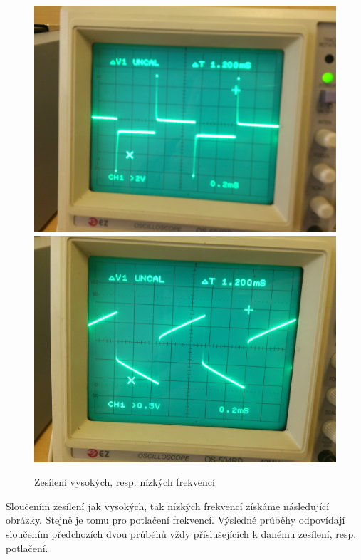 \documentclass[12pt]{article} %
\begin{document}
\begin{figure}[H]
\includegraphics[scale=0.065]{IMG_20131119_133755.jpg}
\includegraphics[scale=0.065]{IMG_20131119_133807.jpg}
\caption{Zesílení vysokých, resp. nízkých frekvencí}
\end{figure}

Sloučením zesílení jak vysokých, tak nízkých frekvencí získáme následující obrázky. Stejně je tomu pro potlačení frekvencí. Výsledné průběhy odpovídají sloučením předchozích dvou průběhů vždy příslušejících k danému zesílení, resp. potlačení.
\end{document}
